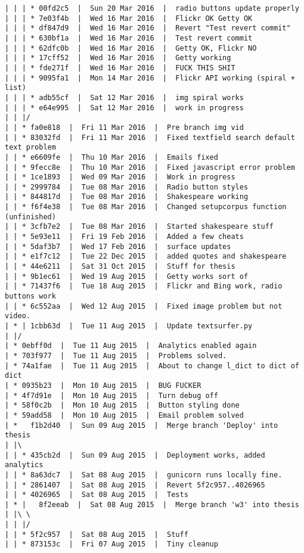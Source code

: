 \begin{verbatim}
| | | * 00fd2c5  |  Sun 20 Mar 2016  |  radio buttons update properly
| | | * 7e03f4b  |  Wed 16 Mar 2016  |  Flickr OK Getty OK
| | | * df847d9  |  Wed 16 Mar 2016  |  Revert "Test revert commit"
| | | * 630bf1a  |  Wed 16 Mar 2016  |  Test revert commit
| | | * 62dfc0b  |  Wed 16 Mar 2016  |  Getty OK, Flickr NO
| | | * 17cff52  |  Wed 16 Mar 2016  |  Getty working
| | | * fde271f  |  Wed 16 Mar 2016  |  FUCK THIS SHIT
| | | * 9095fa1  |  Mon 14 Mar 2016  |  Flickr API working (spiral + list)
| | | * adb55cf  |  Sat 12 Mar 2016  |  img spiral works
| | | * e64e995  |  Sat 12 Mar 2016  |  work in progress
| | |/  
| | * fa0e818  |  Fri 11 Mar 2016  |  Pre branch img vid
| | * 83032fd  |  Fri 11 Mar 2016  |  Fixed textfield search default text problem
| | * e6609fe  |  Thu 10 Mar 2016  |  Emails fixed
| | * 9fecc8e  |  Thu 10 Mar 2016  |  Fixed javascript error problem
| | * 1ce1893  |  Wed 09 Mar 2016  |  Work in progress
| | * 2999784  |  Tue 08 Mar 2016  |  Radio button styles
| | * 844817d  |  Tue 08 Mar 2016  |  Shakespeare working
| | * f6f4e38  |  Tue 08 Mar 2016  |  Changed setupcorpus function (unfinished)
| | * 3cfb7e2  |  Tue 08 Mar 2016  |  Started shakespeare stuff
| | * 5e93e11  |  Fri 19 Feb 2016  |  Added a few cheats
| | * 5daf3b7  |  Wed 17 Feb 2016  |  surface updates
| | * e1f7c12  |  Tue 22 Dec 2015  |  added quotes and shakespeare
| | * 44e6211  |  Sat 31 Oct 2015  |  Stuff for thesis
| | * 9b1ec61  |  Wed 19 Aug 2015  |  Getty works sort of
| | * 71437f6  |  Tue 18 Aug 2015  |  Flickr and Bing work, radio buttons work
| | * 6c552aa  |  Wed 12 Aug 2015  |  Fixed image problem but not video.
| * | 1cbb63d  |  Tue 11 Aug 2015  |  Update textsurfer.py
| |/  
| * 0ebff0d  |  Tue 11 Aug 2015  |  Analytics enabled again
| * 703f977  |  Tue 11 Aug 2015  |  Problems solved.
| * 74a1fae  |  Tue 11 Aug 2015  |  About to change l_dict to dict of dict
| * 0935b23  |  Mon 10 Aug 2015  |  BUG FUCKER
| * 4f7d91e  |  Mon 10 Aug 2015  |  Turn debug off
| * 58f0c2b  |  Mon 10 Aug 2015  |  Button styling done
| * 59add58  |  Mon 10 Aug 2015  |  Email problem solved
| *   f1b2d40  |  Sun 09 Aug 2015  |  Merge branch 'Deploy' into thesis
| |\  
| | * 435cb2d  |  Sun 09 Aug 2015  |  Deployment works, added analytics
| | * 8a63dc7  |  Sat 08 Aug 2015  |  gunicorn runs locally fine.
| | * 2861407  |  Sat 08 Aug 2015  |  Revert 5f2c957..4026965
| | * 4026965  |  Sat 08 Aug 2015  |  Tests
| * |   8f2eeab  |  Sat 08 Aug 2015  |  Merge branch 'w3' into thesis
| |\ \  
| | |/  
| | * 5f2c957  |  Sat 08 Aug 2015  |  Stuff
| | * 873153c  |  Fri 07 Aug 2015  |  Tiny cleanup

\end{verbatim}
